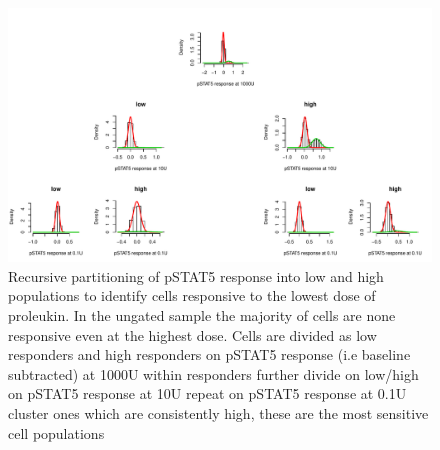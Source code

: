 \hspace{-2cm}
\begin{figure}[h]
\centering
\includegraphics[scale=.5]{IL2/figures/pstat5-rpart.pdf}
{ Recursive partitioning of pSTAT5 response into low and high populations to identify cells responsive to the lowest dose of proleukin. }
{
In the ungated sample the majority of cells are none responsive even at the highest dose.
Cells are divided as low responders and high responders on pSTAT5 response (i.e baseline subtracted) at 1000U 
within responders further divide on low/high on pSTAT5 response at 10U
repeat on pSTAT5 response at 0.1U
cluster ones which are consistently high, these are the most sensitive cell populations 
}
\end{figure}


